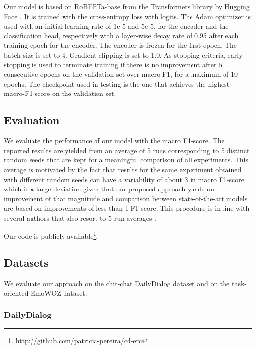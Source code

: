 \documentclass[11pt]{article}
\begin{document}
Our model is based on RoBERTa-base from the Transformers library by Hugging Face \cite{wolf-etal-2020-transformers}. It is trained with the cross-entropy loss with logits. The Adam \cite{kingma2014adam} optimizer is used with an initial learning rate of 1e-5 and 5e-5, for the encoder and the classification head, respectively with a layer-wise decay rate of 0.95 after each training epoch for the encoder. The encoder is frozen for the first epoch. The batch size is set to 4. Gradient clipping is set to 1.0. As stopping criteria, early stopping is used to terminate training if there is no improvement after 5 consecutive epochs on the validation set over macro-F1, for a maximum of 10 epochs.  The checkpoint used in testing is the one that achieves the highest macro-F1 score on the validation set. 




\subsection{Evaluation}

We evaluate the performance of our model with the macro F1-score. The reported results are yielded from an average of 5 runs corresponding to 5 distinct random seeds that are kept for a meaningful comparison of all experiments. This average is motivated by the fact that results for the same experiment obtained with different random seeds can have a variability of about 3 in macro F1-score which is a large deviation given that our proposed approach yields an improvement of that magnitude and comparison between state-of-the-art models are based on improvements of less than 1 F1-score. This procedure is in line with several authors that also resort to 5 run averages \cite{li-etal-2021-past-present} \cite{zhong-etal-2019-knowledge} \cite{shen2021dialogxl} \cite{shen-etal-2021-directed}.

\vspace{2.5mm}

Our code is publicly available\footnote{\url{http://github.com/patricia-pereira/cd-erc}}.

\subsection{Datasets}

We evaluate our approach on the chit-chat DailyDialog \cite{li2017dailydialog} dataset and on the task-oriented EmoWOZ \cite{feng2022emowoz} dataset.

\subsubsection{DailyDialog}
\end{document}
